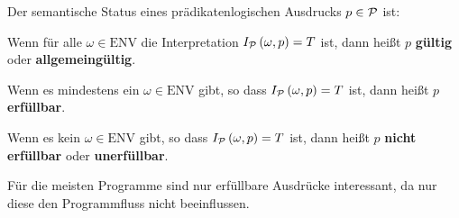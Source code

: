 {\begin{comment}
\textit{Lösung:}
\begin{align*}
&\quad \I{P}{\omega}{(\texists y) lt?(y,x)} \\
&\lra \texists \omega', \omega \sim_{\u{y}} \omega': \; \Iu{P}{\omega'}{lt?(y,x)} \\
&\lra \texists \omega', \omega \sim_{\u{y}} \omega': \; \text{lt?}(\Iu{P}{\omega'}{y},\Iu{P}{\omega'}{x}) \\
&\lra \texists \omega', \omega \sim_{\u{y}} \omega': \; \text{lt?}(\omega'(\tu{y}),\omega'(\tu{x})) \\
&\lra \texists \omega', \omega \sim_{\u{y}} \omega': \; \text{lt?}(\omega'(\tu{y}),0) \\
&\lra \texists \omega', \omega \sim_{\u{y}} \omega': \; \omega'(\tu{y}) < 0
\intertext{Da $\omega'(\tu{y}) \in \N_0$, d.h. $\omega'(\tu{y}) \geq 0$, gibt es keinen Wert den $\omega'(\tu{y})$ annehmen könnte um das Prädikat zu erfüllen.}
&\lra F
\end{align*}
\end{\whichenum}
\end{bsp}
\ifthenelse{\boolean{long}}{}{\end{comment}}

\begin{defn}
Der semantische Status eines prädikatenlogischen Ausdrucks $p \in \mathcal{P}$ ist:
\begin{\whichitem}
\item Wenn für alle $\omega \in \text{ENV}$ die Interpretation $I_{\mathcal{P}}\left(\omega,p\right)=T$ ist, dann heißt $p$ \textbf{gültig} oder \textbf{allgemeingültig}.
\item Wenn es mindestens ein $\omega \in \text{ENV}$ gibt, so dass $I_{\mathcal{P}}\left(\omega,p\right)=T$ ist, dann heißt $p$ \textbf{erfüllbar}.
\item Wenn es kein $\omega \in \text{ENV}$ gibt, so dass $I_{\mathcal{P}}\left(\omega,p\right)=T$ ist, dann heißt $p$ \textbf{nicht erfüllbar} oder \textbf{unerfüllbar}.
\end{\whichitem}
\end{defn}

Für die meisten Programme sind nur erfüllbare Ausdrücke interessant, da nur diese den Programmfluss nicht beeinflussen.

